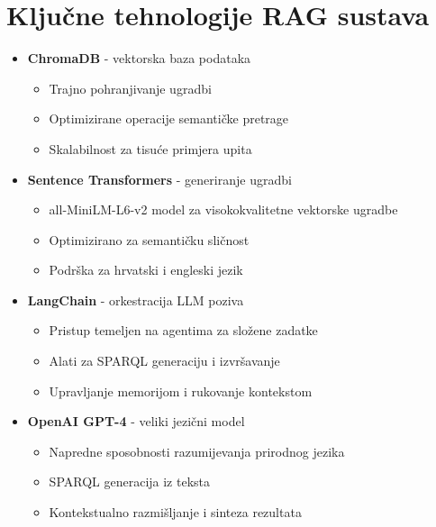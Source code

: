 \section{Ključne tehnologije RAG sustava}
\begin{itemize}
    \item \textbf{ChromaDB} - vektorska baza podataka \cite{wang2023vector}
    \begin{itemize}
        \item Trajno pohranjivanje ugradbi
        \item Optimizirane operacije semantičke pretrage
        \item Skalabilnost za tisuće primjera upita
    \end{itemize}
    
    \item \textbf{Sentence Transformers} - generiranje ugradbi \cite{reimers2019sentence}
    \begin{itemize}
        \item all-MiniLM-L6-v2 model za visokokvalitetne vektorske ugradbe
        \item Optimizirano za semantičku sličnost
        \item Podrška za hrvatski i engleski jezik
    \end{itemize}
    
    \item \textbf{LangChain} - orkestracija LLM poziva \cite{liu2023survey}
    \begin{itemize}
        \item Pristup temeljen na agentima za složene zadatke
        \item Alati za SPARQL generaciju i izvršavanje
        \item Upravljanje memorijom i rukovanje kontekstom
    \end{itemize}
    
    \item \textbf{OpenAI GPT-4} - veliki jezični model \cite{brown2020language}
    \begin{itemize}
        \item Napredne sposobnosti razumijevanja prirodnog jezika
        \item SPARQL generacija iz teksta
        \item Kontekstualno razmišljanje i sinteza rezultata
    \end{itemize}
\end{itemize}

